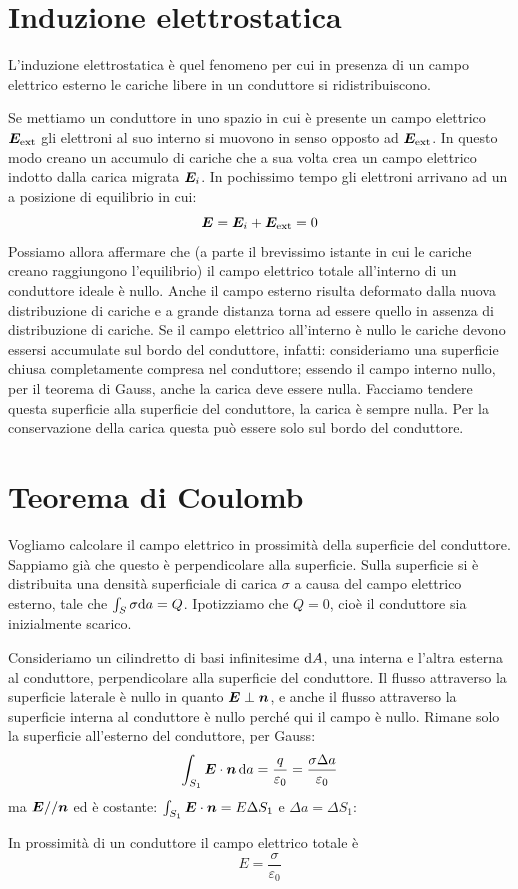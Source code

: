 \section{Induzione elettrostatica}
\begin{Def}
  L'induzione elettrostatica è quel fenomeno per cui in presenza di un campo elettrico esterno le cariche libere in un conduttore si ridistribuiscono.
\end{Def}
Se mettiamo un conduttore in uno spazio in cui è presente un campo elettrico $\boldsymbol{E}_\text{ext}$ gli elettroni al suo interno si muovono in senso opposto ad $\boldsymbol{E}_\text{ext}$. In questo modo creano un accumulo di cariche che a sua volta crea un campo elettrico indotto dalla carica migrata $\boldsymbol{E}_i$. In pochissimo tempo gli elettroni arrivano ad un a posizione di equilibrio in cui:
\[\boldsymbol{E}=\boldsymbol{E}_i+\boldsymbol{E}_\text{ext}=0\]
Possiamo allora affermare che (a parte il brevissimo istante in cui le cariche creano raggiungono l'equilibrio) il campo elettrico totale all'interno di un conduttore ideale è nullo. Anche il campo esterno risulta deformato dalla nuova distribuzione di cariche e a grande distanza torna ad essere quello in assenza di distribuzione di cariche. Se il campo elettrico all'interno è nullo le cariche devono essersi accumulate sul bordo del conduttore, infatti:
consideriamo una superficie chiusa completamente compresa nel conduttore; essendo il campo interno nullo, per il teorema di Gauss, anche la carica deve essere nulla. Facciamo tendere questa superficie alla superficie del conduttore, la carica è sempre nulla. Per la conservazione della carica questa può essere solo sul bordo del conduttore.

\section{Teorema di Coulomb}
Vogliamo calcolare il campo elettrico in prossimità della superficie del conduttore. Sappiamo già che questo è perpendicolare alla superficie. Sulla superficie si è distribuita una densità superficiale di carica $\sigma$ a causa del campo elettrico esterno, tale che $\int_S \sigma\mathrm{d} a=Q$. Ipotizziamo che $Q=0$, cioè il conduttore sia inizialmente scarico.

Consideriamo un cilindretto di basi infinitesime $\mathrm{d} A$, una interna e l'altra esterna al conduttore, perpendicolare alla superficie del conduttore. Il flusso attraverso la superficie laterale è nullo in quanto $\boldsymbol{E}\perp\boldsymbol{n}$, e anche il flusso attraverso la superficie interna al conduttore è nullo perché qui il campo è nullo. Rimane solo la superficie all'esterno del conduttore, per Gauss:
\[\int_{S_1}\boldsymbol{E}\cdot\boldsymbol{n}\,\mathrm{d} a=\frac{q}{\varepsilon_0}=\frac{\sigma\Delta a}{\varepsilon_0}\]
ma $\boldsymbol{E}//\boldsymbol{n}$ ed è costante: $\int_{S_1}\boldsymbol{E}\cdot\boldsymbol{n}=E\Delta S_1$ e $\Delta a = \Delta S_1$:
\begin{Teo}[Coulomb]
  In prossimità di un conduttore il campo elettrico totale è
  \begin{equation}
    \label{eq:teo_coulomb}
    E=\frac{\sigma}{\varepsilon_0}
  \end{equation}
\end{Teo}

